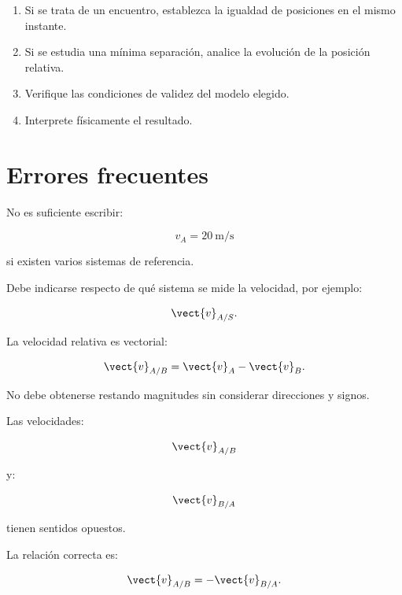\begin{estrategia}
\begin{enumerate}
    \item Si se trata de un encuentro, establezca
    la igualdad de posiciones en el mismo instante.

    \item Si se estudia una mínima separación,
    analice la evolución de la posición relativa.

    \item Verifique las condiciones de validez
    del modelo elegido.

    \item Interprete físicamente el resultado.

\end{enumerate}

\end{estrategia}


\section{Errores frecuentes}

\begin{errorfrecuente}

No es suficiente escribir:

\[
v_A=\SI{20}{\meter\per\second}
\]

si existen varios sistemas de referencia.

Debe indicarse respecto de qué sistema
se mide la velocidad, por ejemplo:

\[
\vect{v}_{A/S}.
\]

\end{errorfrecuente}


\begin{errorfrecuente}

La velocidad relativa es vectorial:

\[
\vect{v}_{A/B}
=
\vect{v}_A-\vect{v}_B.
\]

No debe obtenerse restando magnitudes
sin considerar direcciones y signos.

\end{errorfrecuente}


\begin{errorfrecuente}

Las velocidades:

\[
\vect{v}_{A/B}
\]

y:

\[
\vect{v}_{B/A}
\]

tienen sentidos opuestos.

La relación correcta es:

\[
\vect{v}_{A/B}
=
-\vect{v}_{B/A}.
\]

\end{errorfrecuente}


